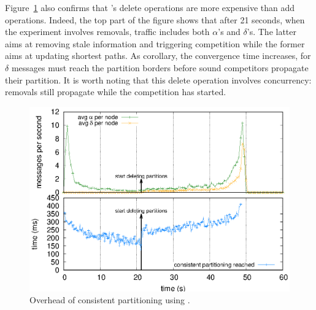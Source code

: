 \begin{asparadesc}
\noindent Figure~\ref{fig:complexity} also confirms that \NAME's
delete operations are more expensive than add operations. Indeed, the
top part of the figure shows that after 21 seconds, when the
experiment involves removals, traffic includes both $\alpha$'s and
$\delta$'s. The latter aims at removing stale information and
triggering competition while the former aims at updating shortest
paths. As corollary, the convergence time increases, for $\delta$
messages must reach the partition borders before sound competitors
propagate their partition. It is worth noting that this delete
operation involves concurrency: removals still propagate while
the competition has started. %


\begin{figure}
  \centering\includegraphics[width=0.65\columnwidth]{img/as_cast_complexity.eps}
  \caption{\label{fig:complexity}Overhead of consistent partitioning
    using \NAME.}
  
\end{figure}


\end{asparadesc}

